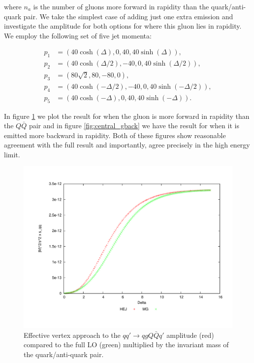 where $n_a$ is the number of gluons more forward in rapidity than the quark/anti-quark pair. We take the simplest case of adding just one extra emission and investigate the amplitude for both options for where this gluon lies in rapidity. We employ the following set of five jet momenta:

\begin{equation}
\begin{split}
p_1 & = (40 \cosh(\Delta), 0, 40, 40 \sinh(\Delta)), \\
p_2 & = (40 \cosh(\Delta/2), -40, 0, 40 \sinh(\Delta/2)), \\
p_3 & = (80 \sqrt{2}, 80, -80, 0), \\
p_4 & = (40 \cosh(-\Delta/2), -40, 0, 40 \sinh(-\Delta/2)), \\
p_5 & = (40 \cosh(-\Delta), 0, 40, 40 \sinh(-\Delta)). 
\end{split}
\end{equation}

In figure \ref{fig:central_gfor} we plot the result for when the gluon is more forward in rapidity than the $Q\bar{Q}$ pair and in figure \ref{fig:central_gback} we have the result for when it is emitted more backward in rapidity. Both of these figures show reasonable agreement with the full result and importantly, agree precisely in the high energy limit. 

\begin{figure}[H]
\centering
\includegraphics[scale=0.44]{Images/qQ_qgqqxQ_sqq.pdf}
\caption{Effective vertex approach to the $qq' \to qgQ\bar{Q}q'$ amplitude (red) compared to the full LO (green) multiplied by the invariant mass of the quark/anti-quark pair.}
\label{fig:central_gfor}
\end{figure}

